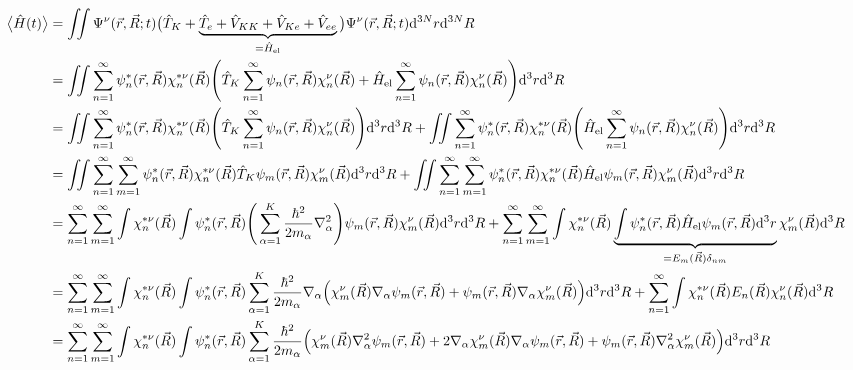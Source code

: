 \documentclass[9pt]{report}
\begin{document}
\begin{align}
\big\langle\hat{H}(t)\big\rangle &= \iint\Psi^{\nu}(\vec{r},\vec{R};t)\big(\hat{T}_K+\underbrace{\hat{T}_{e}+\hat{V}_{KK}+\hat{V}_{Ke}+\hat{V}_{ee}}_{=\hat{H}_{\mathrm{el}}}\big)\Psi^{\nu}(\vec{r},\vec{R};t)\mathrm{d}^{3N}r\mathrm{d}^{3N}R\notag\\
&= \iint\sum_{n=1}^{\infty}\psi_{n}^{*}(\vec{r},\vec{R})\chi_{n}^{*\nu}(\vec{R})\Bigg(\hat{T}_{K}\sum_{n=1}^{\infty}\psi_{n}(\vec{r},\vec{R})\chi_{n}^{\nu}(\vec{R})+\hat{H}_{\mathrm{el}}\sum_{n=1}^{\infty}\psi_{n}(\vec{r},\vec{R})\chi_{n}^{\nu}(\vec{R})\Bigg)\mathrm{d}^3r\mathrm{d}^3R\notag\\
&= \iint\sum_{n=1}^{\infty}\psi_{n}^{*}(\vec{r},\vec{R})\chi_{n}^{*\nu}(\vec{R})\Bigg(\hat{T}_{K}\sum_{n=1}^{\infty}\psi_{n}(\vec{r},\vec{R})\chi_{n}^{\nu}(\vec{R})\Bigg)\mathrm{d}^3r\mathrm{d}^3R+\iint\sum_{n=1}^{\infty}\psi_{n}^{*}(\vec{r},\vec{R})\chi_{n}^{*\nu}(\vec{R})\Bigg(\hat{H}_{\mathrm{el}}\sum_{n=1}^{\infty}\psi_{n}(\vec{r},\vec{R})\chi_{n}^{\nu}(\vec{R})\Bigg)\mathrm{d}^3r\mathrm{d}^3R\notag\\
&= \iint\sum_{n=1}^{\infty}\sum_{m=1}^{\infty}\psi_{n}^{*}(\vec{r},\vec{R})\chi_{n}^{*\nu}(\vec{R})\hat{T}_{K}\psi_{m}(\vec{r},\vec{R})\chi_{m}^{\nu}(\vec{R})\mathrm{d}^3r\mathrm{d}^3R+\iint\sum_{n=1}^{\infty}\sum_{m=1}^{\infty}\psi_{n}^{*}(\vec{r},\vec{R})\chi_{n}^{*\nu}(\vec{R})\hat{H}_{\mathrm{el}}\psi_{m}(\vec{r},\vec{R})\chi_{m}^{\nu}(\vec{R})\mathrm{d}^3r\mathrm{d}^3R\notag\\
&= \sum_{n=1}^{\infty}\sum_{m=1}^{\infty}\int\chi_{n}^{*\nu}(\vec{R})\int\psi_{n}^{*}(\vec{r},\vec{R})\Bigg(\sum_{\alpha=1}^{K}\frac{\hbar^2}{2m_{\alpha}}\nabla_{\alpha}^2\Bigg)\psi_{m}(\vec{r},\vec{R})\chi_{m}^{\nu}(\vec{R})\mathrm{d}^3r\mathrm{d}^3R+\sum_{n=1}^{\infty}\sum_{m=1}^{\infty}\int\chi_{n}^{*\nu}(\vec{R})\underbrace{\int\psi_{n}^{*}(\vec{r},\vec{R})\hat{H}_{\mathrm{el}}\psi_{m}(\vec{r},\vec{R})\mathrm{d}^3r}_{=E_{m}(\vec{R})\delta_{nm}}\chi_{m}^{\nu}(\vec{R})\mathrm{d}^3R\notag\\
&= \sum_{n=1}^{\infty}\sum_{m=1}^{\infty}\int\chi_{n}^{*\nu}(\vec{R})\int\psi_{n}^{*}(\vec{r},\vec{R})\sum_{\alpha=1}^{K}\frac{\hbar^2}{2m_{\alpha}}\nabla_{\alpha}\Big(\chi_{m}^{\nu}(\vec{R})\nabla_{\alpha}\psi_{m}(\vec{r},\vec{R})+\psi_{m}(\vec{r},\vec{R})\nabla_{\alpha}\chi_{m}^{\nu}(\vec{R})\Big)\mathrm{d}^3r\mathrm{d}^3R +\sum_{n=1}^{\infty}\int\chi_{n}^{*\nu}(\vec{R})E_{n}(\vec{R})\chi_{n}^{\nu}(\vec{R})\mathrm{d}^3R\notag\\
&= \sum_{n=1}^{\infty}\sum_{m=1}^{\infty}\int\chi_{n}^{*\nu}(\vec{R})\int\psi_{n}^{*}(\vec{r},\vec{R})\sum_{\alpha=1}^{K}\frac{\hbar^2}{2m_{\alpha}}\Big(\chi_{m}^{\nu}(\vec{R})\nabla_{\alpha}^{2}\psi_{m}(\vec{r},\vec{R})+2\nabla_{\alpha}\chi_{m}^{\nu}(\vec{R})\nabla_{\alpha}\psi_{m}(\vec{r},\vec{R})+\psi_{m}(\vec{r},\vec{R})\nabla_{\alpha}^{2}\chi_{m}^{\nu}(\vec{R})\Big)\mathrm{d}^3r\mathrm{d}^3R\notag\\

\end{align}
\end{document}
